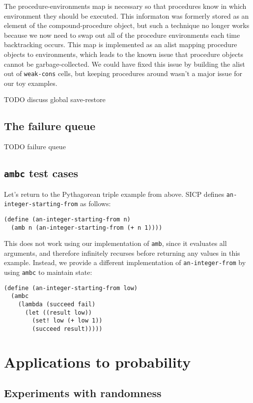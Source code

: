 \documentclass{article}
\begin{document}
The procedure-environments map is necessary so that procedures know in
which environment they should be executed.  This informaton was
formerly stored as an element of the compound-procedure object, but
such a technique no longer works because we now need to swap out all
of the procedure environments each time backtracking occurs.  This map
is implemented as an alist mapping procedure objects to environments,
which leads to the known issue that procedure objects cannot be
garbage-collected. We could have fixed this issue by building the
alist out of \texttt{weak-cons} cells, but keeping procedures around
wasn't a major issue for our toy examples.

TODO discuss global save-restore

\subsection{The failure queue}

TODO failure queue

\subsection{\texttt{ambc} test cases}

Let's return to the Pythagorean triple example from above. SICP defines
\texttt{an-integer-starting-from} as follows:
\begin{lstlisting}
(define (an-integer-starting-from n)
  (amb n (an-integer-starting-from (+ n 1))))
\end{lstlisting}
This does not work using our implementation of \texttt{amb}, since it evaluates
all arguments, and therefore infinitely recurses before returning any values in
this example. Instead, we provide a different implementation of
\texttt{an-integer-from} by using \texttt{ambc} to maintain state:
\begin{lstlisting}
(define (an-integer-starting-from low)
  (ambc
    (lambda (succeed fail)
      (let ((result low))
        (set! low (+ low 1))
        (succeed result)))))
\end{lstlisting}

\section{Applications to probability}

\subsection{Experiments with randomness}
\end{document}
